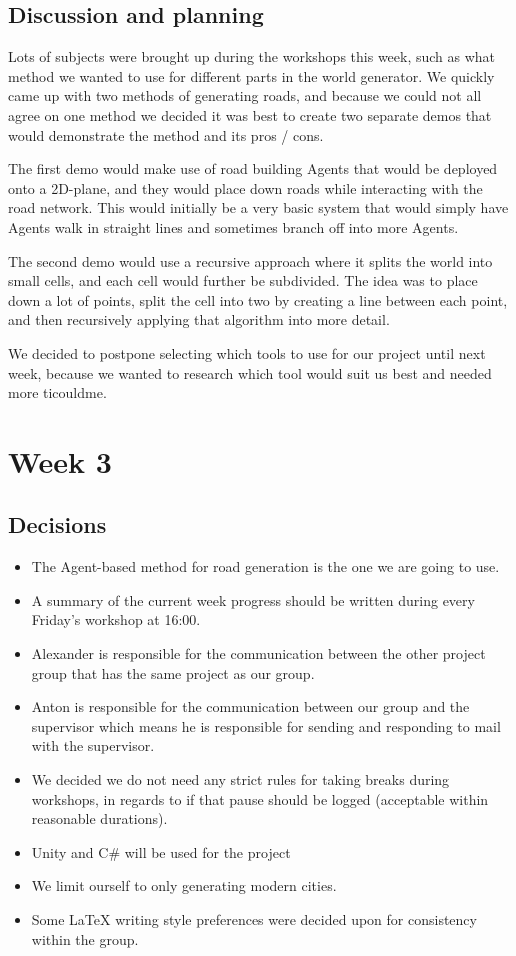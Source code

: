 \documentclass[11pt]{article}
\begin{document}
\subsection*{Discussion and planning}
\label{sec:orgce683b9}
Lots of subjects were brought up during the workshops this week, such as what
method we wanted to use for different parts in the world generator.
We quickly came up with two methods of generating roads, and because we could
not all agree on one method we decided it was best to create two separate demos
that would demonstrate the method and its pros / cons.

The first demo would make use of road building Agents that would be deployed
onto a 2D-plane, and they would place down roads while interacting with the road
network. This would initially be a very basic system that would simply have
Agents walk in straight lines and sometimes branch off into more Agents.

The second demo would use a recursive approach where it splits the world into
small cells, and each cell would further be subdivided. The idea was to place
down a lot of points, split the cell into two by creating a line between each
point, and then recursively applying that algorithm into more detail.

We decided to postpone selecting which tools to use for our project until next
week, because we wanted to research which tool would suit us best and needed
more ticouldme.

\section*{Week 3}
\label{sec:orgce0b2b0}
\subsection*{Decisions}
\label{sec:org4a2e8db}
\begin{decisions}
\begin{itemize}
\item The Agent-based method for road generation is the one we are going to use.
\item A summary of the current week progress should be written during every Friday's
workshop at 16:00.
\item Alexander is responsible for the communication between the other project
group that has the same project as our group.
\item Anton is responsible for the communication between our group and the
supervisor which means he is responsible for sending and responding to mail
with the supervisor.
\item We decided we do not need any strict rules for taking breaks during workshops,
in regards to if that pause should be logged (acceptable within reasonable
durations).
\item Unity and C\# will be used for the project
\item We limit ourself to only generating modern cities.
\item Some \LaTeX{} writing style preferences were decided upon for consistency within
the group.
\end{itemize}
\end{decisions}
\end{document}
